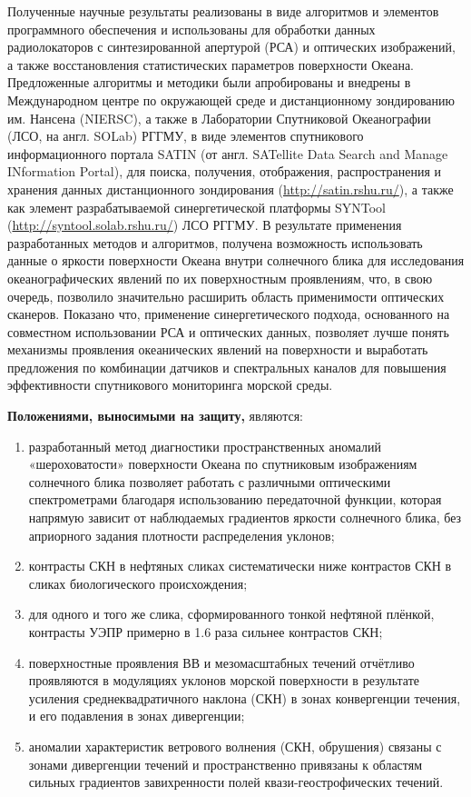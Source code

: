 Полученные научные результаты реализованы в виде алгоритмов и элементов программного обеспечения и использованы для обработки данных радиолокаторов с синтезированной апертурой (РСА) и оптических изображений, а также восстановления статистических параметров поверхности Океана.
Предложенные алгоритмы и методики были апробированы и внедрены в Международном центре по окружающей среде и дистанционному зондированию им. Нансена (NIERSC), а также в Лаборатории Спутниковой Океанографии (ЛСО, на англ. SOLab) РГГМУ, в виде элементов спутникового информационного портала SATIN (от англ. SATellite Data Search and Manage INformation Portal), для поиска, получения, отображения, распространения и хранения данных дистанционного зондирования (\url{http://satin.rshu.ru/}), а также как элемент разрабатываемой синергетической платформы SYNTool (\url{http://syntool.solab.rshu.ru/}) ЛСО РГГМУ.
В результате применения разработанных методов и алгоритмов, получена возможность использовать данные о яркости поверхности Океана внутри солнечного блика для исследования океанографических явлений по их поверхностным проявлениям, что, в свою очередь, позволило значительно расширить область применимости оптических сканеров. Показано что, применение синергетического подхода, основанного на совместном использовании РСА и оптических данных, позволяет лучше понять механизмы проявления океанических явлений на поверхности и выработать предложения по комбинации датчиков и спектральных каналов для повышения эффективности спутникового мониторинга морской среды.

\textbf{Положениями, выносимыми на защиту,} являются:

\begin{enumerate}
\item  разработанный метод диагностики пространственных аномалий «шероховатости» поверхности Океана по спутниковым изображениям солнечного блика позволяет работать с различными оптическими спектрометрами благодаря использованию передаточной функции, которая напрямую зависит от наблюдаемых градиентов яркости солнечного блика, без априорного задания плотности распределения уклонов;
\item контрасты СКН в нефтяных сликах систематически ниже контрастов СКН в сликах биологического происхождения;
\item для одного и того же слика, сформированного тонкой нефтяной плёнкой, контрасты УЭПР примерно в 1.6 раза сильнее контрастов СКН;
\item поверхностные проявления ВВ и мезомасштабных течений отчётливо проявляются в модуляциях уклонов морской поверхности в результате усиления среднеквадратичного наклона (СКН) в зонах конвергенции течения, и его подавления в зонах дивергенции;
\item аномалии характеристик ветрового волнения (СКН, обрушения) связаны с зонами дивергенции течений и пространственно привязаны к областям сильных градиентов завихренности полей квази-геострофических течений.

\end{enumerate}

